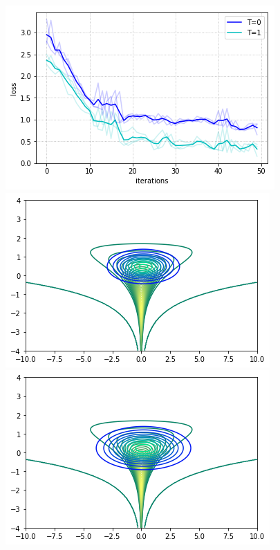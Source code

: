 \begin{figure}[!htb]
\begin{center}
\hspace{-0.5em}
  \includegraphics[width=\linewidth]{img/comp_funnel.png}
\endminipage\hfill
{}
  \includegraphics[width=\linewidth]{img/funnel1.png}
\endminipage
{}%
  \includegraphics[width=\linewidth]{img/funnel2.png}

\end{center}
\end{figure}
